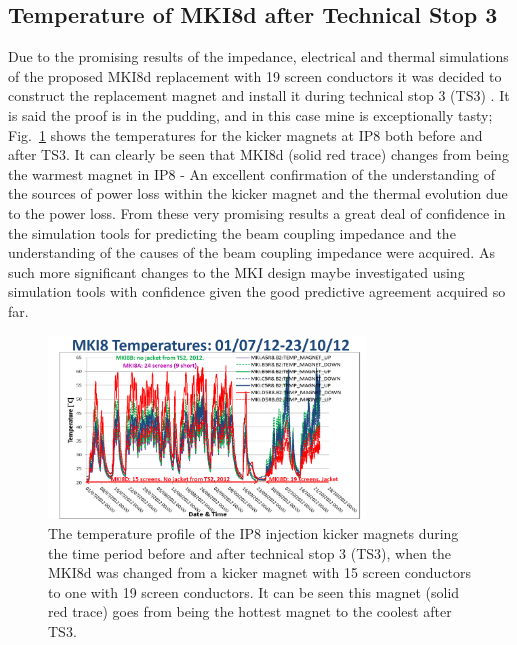 \subsection{Temperature of MKI8d after Technical Stop 3}

Due to the promising results of the impedance, electrical and thermal simulations of the proposed MKI8d replacement with 19 screen conductors it was decided to construct the replacement magnet and install it during technical stop 3 (TS3) \cite{Barnes:emisMKITemp}. It is said the proof is in the pudding, and in this case mine is exceptionally tasty; Fig.~\ref{fig:heating-mki8-post-ts3} shows the temperatures for the kicker magnets at IP8 both before and after TS3. It can clearly be seen that MKI8d (solid red trace) changes from being the warmest magnet in IP8 - An excellent confirmation of the understanding of the sources of power loss within the kicker magnet and the thermal evolution due to the power loss. From these very promising results a great deal of confidence in the simulation tools for predicting the beam coupling impedance and the understanding of the causes of the beam coupling impedance were acquired. As such more significant changes to the MKI design maybe investigated using simulation tools with confidence given the good predictive agreement acquired so far.

\begin{figure}
\begin{center}
\includegraphics[width=0.75\textwidth]{LHC_MKI/figures/mki8-temps-post-ts3.png}
\end{center}
\label{fig:heating-mki8-post-ts3}
\caption{The temperature profile of the IP8 injection kicker magnets during the time period before and after technical stop 3  (TS3), when the MKI8d was changed from a kicker magnet with 15 screen conductors to one with 19 screen conductors. It can be seen this magnet (solid red trace) goes from being the hottest magnet to the coolest after TS3.}
\end{figure}